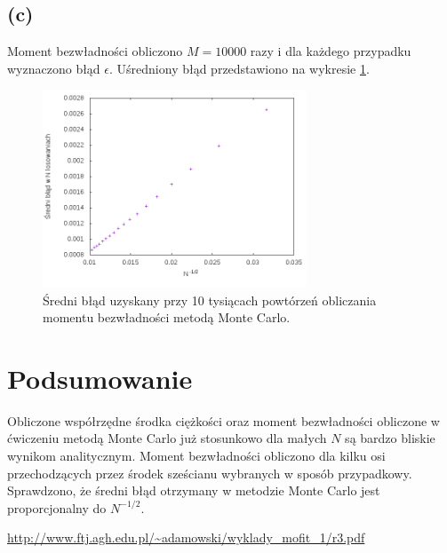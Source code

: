 \documentclass[11pt]{article}
\begin{document}
\subsection*{(c)}
Moment bezwładności obliczono $M=10000$ razy i dla każdego przypadku wyznaczono błąd $\epsilon$. Uśredniony 
błąd przedstawiono na wykresie \ref{fig:2}.
\begin{figure} 
\centering
\includegraphics[width=0.7\textwidth]{ERR5.png}
\caption{Średni błąd uzyskany przy 10 tysiącach powtórzeń obliczania momentu bezwładności metodą Monte Carlo.}\label{fig:2}
\end{figure}
\section*{Podsumowanie}
Obliczone współrzędne środka ciężkości oraz moment bezwładności obliczone w ćwiczeniu metodą Monte Carlo już stosunkowo dla
małych $N$ są bardzo bliskie wynikom analitycznym. Moment bezwładności obliczono dla kilku osi przechodzących przez środek
sześcianu wybranych w sposób przypadkowy. 
Sprawdzono, że średni błąd otrzymany w metodzie Monte Carlo jest proporcjonalny do $N^{-1/2}$.  


\begin{thebibliography}{9}
    \url{http://www.ftj.agh.edu.pl/~adamowski/wyklady_mofit_1/r3.pdf}
\end{thebibliography}
\end{document}
